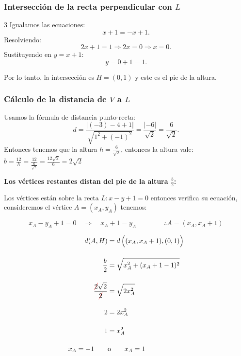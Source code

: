 \documentclass[11pt]{article}
\newcommand{\Cancelar}[2][black]{{\color{#1}\cancel{\color{black}#2}}}%
\begin{document}
\begin{enumerate}[\hspace{-5mm} 1) ]
\begin{enumerate}[(a) ]
\subsubsection*{Intersección de la recta perpendicular con $L$}
\begin{multicols}{3}
Igualamos las ecuaciones:
\[
x + 1 = -x + 1.
\]
Resolviendo:
\[
2x + 1 = 1 \Rightarrow 2x = 0 \Rightarrow x = 0.
\]
Sustituyendo en $y = x + 1$:
\[
y = 0 + 1 = 1.
\] 

\end{multicols}

Por lo tanto, la intersección es $H = (0,1)$ y este es el pie de la altura.

\subsubsection*{Cálculo de la distancia de $V$ a $L$}
Usamos la fórmula de distancia punto-recta:
\[
d = \frac{|(-3) - 4 + 1|}{\sqrt{1^2 + (-1)^2}} = \frac{|-6|}{\sqrt{2}} = \frac{6}{\sqrt{2}}.
\]
Entonces tenemos que la altura   $h = \frac{6}{\sqrt{2}}$, entonces la altura vale: $b= \frac{12}{h} = \frac{12}{\frac{6}{\sqrt{2}}} = \frac{12\sqrt{2}}{6}= 2 \sqrt{2} $



\bigskip


\textbf{Los vértices restantes  distan del pie de la altura $\frac{b}{2}$:}



\bigskip



Los vértices están sobre la recta $L : x - y + 1 = 0$ entonces verifica su ecuación, consideremos el vértice $ A = (x_A, y_A) $ tenemos: 

\[
x_A -y_A +1 = 0 
\quad 
\Longrightarrow
\quad
x_A  + 1=  y_A   
\qquad
\qquad
\therefore A = \left( x_A, x_A  + 1 \right)
\]

\begin{align*}
    d(A , H) 
    &= d \left(\rule{0mm}{4mm} (x_A, x_A  + 1 ) , (0,1)\right)
    \\[4mm]
    \frac{b}{2}
    &= \sqrt{x_A^2 + (x_A+1 -1)^2 \rule{0mm}{3.5mm}}
    \\[4mm]
    \frac{\Cancelar[red]{2}\sqrt{2}}{\Cancelar[red]{2}}
    &= \sqrt{ 2x_A^2  \rule{0mm}{3.5mm}}
    \\[4mm]
    2
    &=
    2x_A^2
    \\[4mm]
    1
    &=
    x_A^2
    \\[4mm]
    x_A = -1 \qquad
    & \text{o}\qquad
    x_A= 1
\end{align*}


\end{enumerate}
\end{enumerate}
\end{document}
